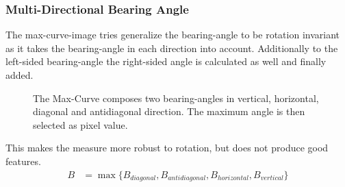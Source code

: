 \subsubsection{Multi-Directional Bearing Angle}

The \gls{max-curve-image} tries generalize the \gls{bearing-angle} to be rotation invariant as it takes the \gls{bearing-angle} in each direction into account.
Additionally to the left-sided \gls{bearing-angle} the right-sided angle is calculated as well and finally added.

\begin{figure}
    
    \caption[Schematic Representation of the Max-Curve]{The Max-Curve composes two \Glspl{bearing-angle} in vertical, horizontal, diagonal and antidiagonal direction. The maximum angle is then selected as pixel value.}
\end{figure}

This makes the measure more robust to rotation, but does not produce good features.
\begin{align}
    B &= \max{\{B_{diagonal}, B_{antidiagonal}, B_{horizontal}, B_{vertical}\}}
\end{align}

